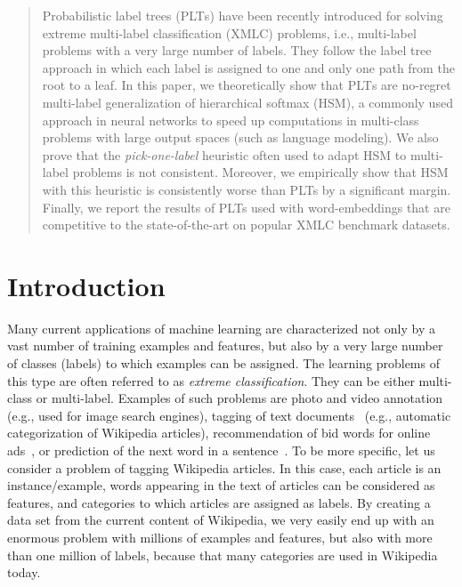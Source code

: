 \documentclass{article}
\newcommand{\Algo}[1]{\textsc{#1}}
\begin{document}
\printAffiliationsAndNotice{\icmlEqualContribution} %

\begin{abstract}
Probabilistic label trees (\Algo{PLT}s) have been recently introduced for solving extreme multi-label classification (XMLC) problems, i.e., multi-label problems with a very large number of labels. 
They follow the label tree approach in which each label is assigned to one and only one path from the root to a leaf. 
%
In this paper, we theoretically show that \Algo{PLT}s are no-regret multi-label generalization of hierarchical softmax (\Algo{HSM}), a commonly used approach in neural networks to speed up computations in multi-class problems with large output spaces (such as language modeling). We also prove that the \emph{pick-one-label} heuristic often used to adapt HSM to multi-label problems is not consistent. Moreover, we empirically show that HSM with this heuristic is consistently worse than PLTs by a significant margin. Finally, we report the results of PLTs used with word-embeddings that are competitive to the state-of-the-art on popular XMLC benchmark datasets. 
\end{abstract}

\section{Introduction}
\label{sec:introduction}

Many current applications of machine learning are characterized not only by a vast number of training examples and features, but also by a very large number of classes (labels) to which examples can be assigned. The learning problems of this type are often referred to as \emph{extreme classification}. They can be either multi-class or multi-label. Examples of such problems are photo and video annotation~\citep{Deng_et_al_2011} (e.g., used for image search engines), tagging of text documents~\citep{Dekel_Shamir_2010} (e.g., automatic categorization of Wikipedia articles), recommendation of bid words for online ads~\citep{Prabhu_Varma_2014}, or prediction of the next word in a sentence~\citep{Mikolov_et_al_2013}.
%
To be more specific, let us consider a problem of tagging Wikipedia articles. In this case, each article is an instance/example, words appearing in the text of articles can be considered as features, and categories to which articles are assigned as labels. By creating a data set from the current content of Wikipedia, we very easily end up with an enormous problem with millions of examples and features, but also with more than one million of labels, because that many categories are used in Wikipedia today. 
\end{document}
